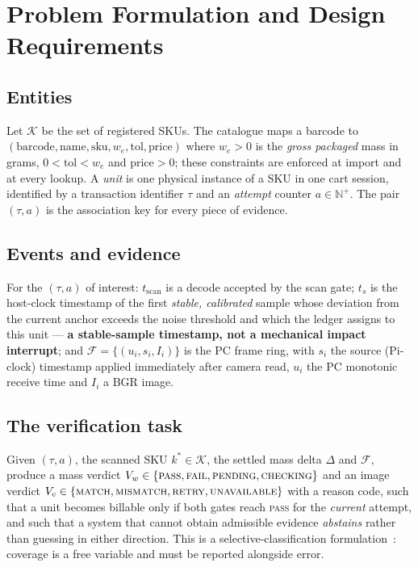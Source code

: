 \documentclass[conference]{IEEEtran}
\begin{document}
\section{Problem Formulation and Design Requirements}
\label{sec:problem}

\subsection{Entities}
Let $\mathcal{K}$ be the set of registered SKUs. The catalogue maps a barcode to
$(\text{barcode},\text{name},\text{sku},w_e,\mathrm{tol},\text{price})$ where $w_e>0$ is the
\emph{gross packaged} mass in grams, $0<\mathrm{tol}<w_e$ and $\text{price}>0$; these constraints are
enforced at import and at every lookup. A \emph{unit} is one physical instance of a SKU in one cart
session, identified by a transaction identifier $\tau$ and an \emph{attempt} counter
$a\in\mathbb{N}^{+}$. The pair $(\tau,a)$ is the association key for every piece of evidence.

\subsection{Events and evidence}
For the $(\tau,a)$ of interest: $t_{\text{scan}}$ is a decode accepted by the scan gate; $t_s$ is the
host-clock timestamp of the first \emph{stable, calibrated} sample whose deviation from the current
anchor exceeds the noise threshold and which the ledger assigns to this unit --- \textbf{a
stable-sample timestamp, not a mechanical impact interrupt}; and
$\mathcal{F}=\{(u_i,s_i,I_i)\}$ is the PC frame ring, with $s_i$ the source (Pi-clock) timestamp
applied immediately after camera read, $u_i$ the PC monotonic receive time and $I_i$ a BGR image.

\subsection{The verification task}
Given $(\tau,a)$, the scanned SKU $k^*\in\mathcal{K}$, the settled mass delta $\Delta$ and
$\mathcal{F}$, produce a mass verdict $V_w\in\{\textsc{pass},\textsc{fail},\textsc{pending},
\textsc{checking}\}$ and an image verdict $V_c\in\{\textsc{match},\textsc{mismatch},\textsc{retry},
\textsc{unavailable}\}$ with a reason code, such that a unit becomes billable only if both gates
reach \textsc{pass} for the \emph{current} attempt, and such that a system that cannot obtain
admissible evidence \emph{abstains} rather than guessing in either direction. This is a
selective-classification formulation~\cite{R61}: coverage is a free variable and must be reported
alongside error.
\end{document}
